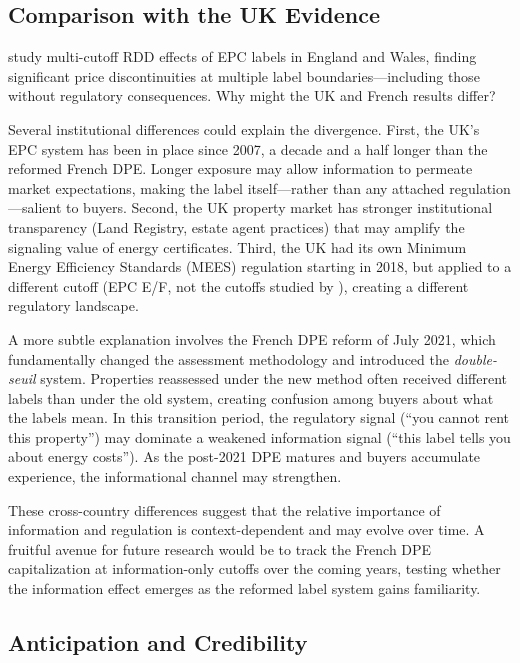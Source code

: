 \documentclass[12pt]{article}
\begin{document}
\subsection{Comparison with the UK Evidence}

\citet{sejas2025epc} study multi-cutoff RDD effects of EPC labels in England and Wales, finding significant price discontinuities at multiple label boundaries---including those without regulatory consequences. Why might the UK and French results differ?

Several institutional differences could explain the divergence. First, the UK's EPC system has been in place since 2007, a decade and a half longer than the reformed French DPE. Longer exposure may allow information to permeate market expectations, making the label itself---rather than any attached regulation---salient to buyers. Second, the UK property market has stronger institutional transparency (Land Registry, estate agent practices) that may amplify the signaling value of energy certificates. Third, the UK had its own Minimum Energy Efficiency Standards (MEES) regulation starting in 2018, but applied to a different cutoff (EPC E/F, not the cutoffs studied by \citeauthor{sejas2025epc}), creating a different regulatory landscape.

A more subtle explanation involves the French DPE reform of July 2021, which fundamentally changed the assessment methodology and introduced the \textit{double-seuil} system. Properties reassessed under the new method often received different labels than under the old system, creating confusion among buyers about what the labels mean. In this transition period, the regulatory signal (``you cannot rent this property'') may dominate a weakened information signal (``this label tells you about energy costs''). As the post-2021 DPE matures and buyers accumulate experience, the informational channel may strengthen.

These cross-country differences suggest that the relative importance of information and regulation is context-dependent and may evolve over time. A fruitful avenue for future research would be to track the French DPE capitalization at information-only cutoffs over the coming years, testing whether the information effect emerges as the reformed label system gains familiarity.

\subsection{Anticipation and Credibility}
\end{document}
